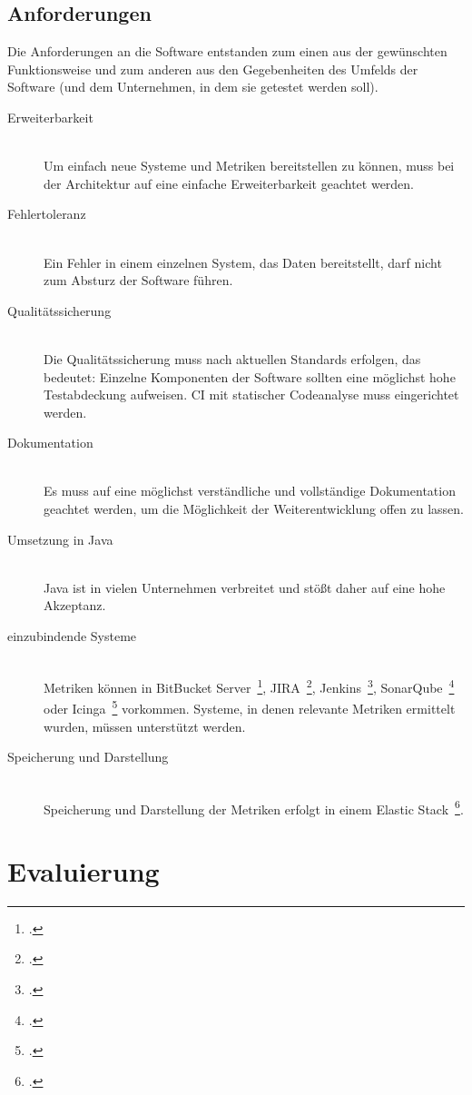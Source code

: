 \subsection{Anforderungen}\label{vorgehen:software}

Die Anforderungen an die Software entstanden zum einen aus der gewünschten Funktionsweise und zum anderen aus den Gegebenheiten des Umfelds der Software (und dem Unternehmen, in dem sie getestet werden soll).

\begin{description}
    \item[Erweiterbarkeit] \hfill \\ Um einfach neue Systeme und Metriken bereitstellen zu können, muss bei der Architektur auf eine einfache Erweiterbarkeit geachtet werden.
    \item[Fehlertoleranz] \hfill \\ Ein Fehler in einem einzelnen System, das Daten bereitstellt, darf nicht zum Absturz der Software führen.
    \item[Qualitätssicherung] \hfill \\ Die Qualitätssicherung muss nach aktuellen Standards erfolgen, das bedeutet: Einzelne Komponenten der Software sollten eine möglichst hohe Testabdeckung aufweisen. \ac{CI} mit statischer Codeanalyse muss eingerichtet werden.
    \item[Dokumentation] \hfill \\ Es muss auf eine möglichst verständliche und vollständige Dokumentation geachtet werden, um die Möglichkeit der Weiterentwicklung offen zu lassen.
    \item[Umsetzung in Java] \hfill \\ Java ist in vielen Unternehmen verbreitet und stößt daher auf eine hohe Akzeptanz.
    \item[einzubindende Systeme] \hfill \\ Metriken können in BitBucket Server~\footcite{bitbucket_server}, JIRA~\footcite{jira}, Jenkins~\footcite{jenkins}, SonarQube~\footcite{sonarqube} oder Icinga~\footcite{icinga} vorkommen. Systeme, in denen relevante Metriken ermittelt wurden, müssen unterstützt werden.
    \item[Speicherung und Darstellung] \hfill \\ Speicherung und Darstellung der Metriken erfolgt in einem Elastic Stack~\footcite{elastic_stack}.
\end{description}

\clearpage
\section{Evaluierung}

